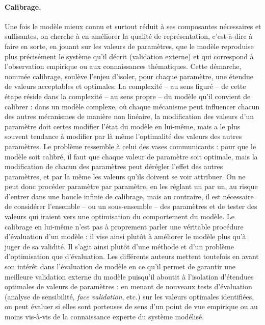 \paragraph{Calibrage.}
Une fois le modèle mieux connu et surtout réduit à ses composantes nécessaires et suffisantes, on cherche à en améliorer la qualité de représentation, c'est-à-dire à faire en sorte, en jouant sur les valeurs de paramètres, que le modèle reproduise plus précisément le système qu'il décrit (validation externe) et qui correspond à l'observation empirique ou aux connaissances thématiques.
Cette démarche, nommée calibrage, soulève l'enjeu d'isoler, pour chaque paramètre, une étendue de valeurs acceptables et optimales.
La complexité -- au sens figuré -- de cette étape réside dans la complexité -- au sens propre -- du modèle qu'il convient de calibrer :
	dans un modèle complexe, où chaque mécanisme peut influencer chacun des autres mécanismes de manière non linéaire, la modification des valeurs d'un paramètre doit certes modifier l'état du modèle en lui-même, mais a le plus souvent tendance à modifier par là même l'optimalité des valeurs des autres paramètres.
Le problème ressemble à celui des vases communicants :
	pour que le modèle soit calibré, il faut que chaque valeur de paramètre soit optimale, mais la modification de chacun des paramètres peut dérégler l'effet des autres paramètres, et par la même les valeurs qu'ils doivent se voir attribuer.
On ne peut donc procéder paramètre par paramètre, en les réglant un par un, au risque d'entrer dans une boucle infinie de calibrage, mais au contraire, il est nécessaire de considérer l'ensemble -- ou un sous-ensemble -- des paramètres et de tester des valeurs qui iraient vers une optimisation du comportement du modèle.
Le calibrage en lui-même n'est pas à proprement parler une véritable procédure d'évaluation d'un modèle :
	il vise ainsi plutôt à \og améliorer\fg{} le modèle plus qu'à juger de sa validité.
Il s'agit ainsi plutôt d'une méthode et d'un problème d'optimisation que d'évaluation.
Les différents auteurs mettent toutefois en avant son intérêt dans l'évaluation de modèle en ce qu'il permet de garantir une meilleure validation externe du modèle puisqu'il aboutit à l'isolation d'étendues optimales de valeurs de paramètres :
	en menant de nouveaux tests d'évaluation (analyse de sensibilité, \textit{face validation}, etc.) \autocite[43]{klugl_validation_2008} sur les valeurs optimales identifiées, on peut évaluer si elles sont porteuses de sens d'un point de vue empirique ou au moins vis-à-vis de la connaissance experte du système modélisé.

